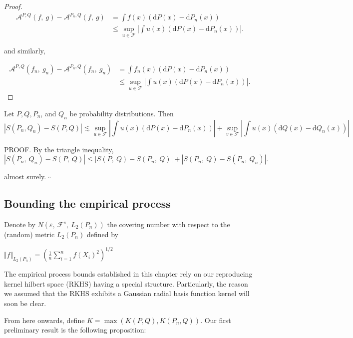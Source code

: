 \begin{proof}
		\begin{align*}
			\mathcal{A}^{P,Q}(f,\ g)-\mathcal{A}^{P_{n},Q}(f,\ g) &=\int f(x)(\mathrm{d}P(x)-\mathrm{d}P_{n}(x)) \\
			&\leq\sup_{u\in \mathcal{F}}|\int u(x)(\mathrm{d}P(x)-\mathrm{d}P_{n}(x))|.
		\end{align*}
		
		and similarly,
		
		\begin{align*}
			\mathcal{A}^{P,Q}(f_n,\ g_n)-\mathcal{A}^{P_{n},Q}(f_n,\ g_n) &=\int f_n(x)(\mathrm{d}P(x)-\mathrm{d}P_{n}(x)) \\
			&\leq\sup_{u\in \mathcal{F}}|\int u(x)(\mathrm{d}P(x)-\mathrm{d}P_{n}(x))|.
		\end{align*}
		
	\end{proof}
	
	\begin{corollary}
		
		Let $P, Q, P_{n}$, and $Q_{n}$ be probability distributions. Then
		$$|S(P_{n}, Q_{n})-S(P, Q)| \lesssim \sup_{u\in \mathcal{F}}|\int u(x)(\mathrm{d}P(x)-\mathrm{d}P_{n}(x))|
		+\sup_{v\in \mathcal{F}}|\int u(x)(\mathrm{d}Q(x)-\mathrm{d}Q_{n}(x))|
		$$
	\end{corollary}
	
	PROOF. By the triangle inequality,
	$$|S(P_{n},\ Q_{n})-S(P,\ Q)|\leq|S(P,\ Q)-S(P_{n},\ Q)|+|S(P_{n},\ Q)-S(P_{n},\ Q_{n})|.$$
	
	almost surely. $\square $
	\medskip
	
	\subsection*{Bounding the empirical process}
	Denote by $N(\varepsilon,\ \mathcal{F}^{s},\ L_{2}(P_{n}))$ the covering number with respect to the (random) metric $L_{2}(P_{n})$ defined by
	
	$\displaystyle \Vert f\Vert_{L_{2}(P_{n})}=\left(\frac{1}{n}\sum_{i=1}^{n}f(X_{i})^{2}\right)^{1/2}$
	
	The empirical process bounds established in this chapter rely on our reproducing kernel hilbert space (RKHS) having a special structure. Particularly, the reason we assumed that the RKHS exhibits a Gaussian radial basis function kernel will soon be clear.
	
	From here onwards, define $K=\max(K(P,Q),K(P_n,Q))$. Our first preliminary result is the following proposition:
	
